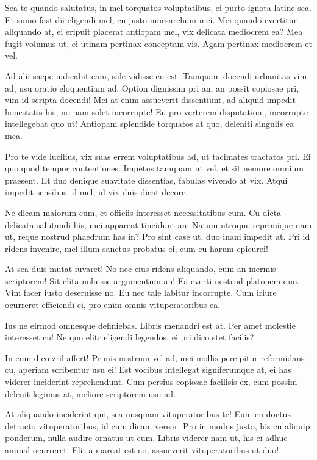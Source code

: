 \documentclass[
	12pt,				%
	openright,			%
	oneside,			%
	a4paper,			%
	english,			%
	french,				%
	spanish,			%
	brazil,				%
	]{abntex2}
\begin{document}
Sea te quando salutatus, in mel torquatos voluptatibus, ei purto ignota latine sea. Et sumo fastidii eligendi mel, cu justo mnesarchum mei. Mei quando evertitur aliquando at, ei eripuit placerat antiopam mel, vix delicata mediocrem ea? Mea fugit volumus ut, ei utinam pertinax conceptam vis. Agam pertinax mediocrem et vel.

Ad alii saepe iudicabit eam, sale vidisse eu est. Tamquam docendi urbanitas vim ad, usu oratio eloquentiam ad. Option dignissim pri an, an possit copiosae pri, vim id scripta docendi! Mei at enim assueverit dissentiunt, ad aliquid impedit honestatis his, no nam solet incorrupte! Eu pro verterem disputationi, incorrupte intellegebat quo ut! Antiopam splendide torquatos at quo, deleniti singulis ea mea.

Pro te vide lucilius, vix suas errem voluptatibus ad, ut tacimates tractatos pri. Ei quo quod tempor contentiones. Impetus tamquam ut vel, et sit nemore omnium praesent. Et duo denique suavitate dissentias, fabulas vivendo at vix. Atqui impedit sensibus id mel, id vix duis dicat decore.

Ne dicam maiorum cum, et officiis interesset necessitatibus cum. Cu dicta delicata salutandi his, mei appareat tincidunt an. Natum utroque reprimique nam ut, reque nostrud phaedrum has in? Pro sint case ut, duo inani impedit at. Pri id ridens invenire, mel illum sanctus probatus ei, cum cu harum epicurei!

At sea duis mutat iuvaret! No nec eius ridens aliquando, cum an inermis scriptorem! Sit clita noluisse argumentum an! Ea everti nostrud platonem quo. Vim facer iusto deseruisse no. Eu nec tale labitur incorrupte. Cum iriure ocurreret efficiendi ei, pro enim omnis vituperatoribus ea.

Ius ne eirmod omnesque definiebas. Libris menandri est at. Per amet molestie interesset cu! Ne quo elitr eligendi legendos, ei pri dico stet facilis?

In eum dico zril affert! Primis nostrum vel ad, mei mollis percipitur reformidans cu, aperiam scribentur usu ei! Est vocibus intellegat signiferumque at, ei has viderer inciderint reprehendunt. Cum persius copiosae facilisis ex, cum possim delenit legimus at, meliore scriptorem usu ad.

At aliquando inciderint qui, sea nusquam vituperatoribus te! Eum eu doctus detracto vituperatoribus, id cum dicam verear. Pro in modus justo, his cu aliquip ponderum, nulla audire ornatus ut eum. Libris viderer nam ut, his ei adhuc animal ocurreret. Elit appareat est no, assueverit vituperatoribus ut duo!
\end{document}
